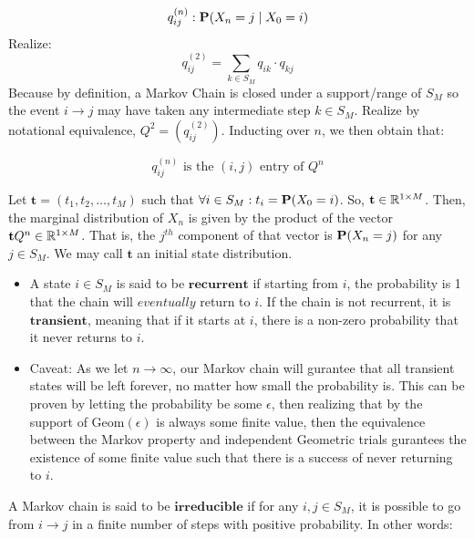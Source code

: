 $$ q_{ij}^{(n)}: \Prb(X_n = j \mid X_0 = i)$$
Realize:
$$q_{ij}^{(2)} = \sum_{k \in S_M} q_{ik}\cdot q_{kj}$$
Because by definition, a Markov Chain is closed under a support/range of $S_M$ so the event $i \to j$ may have taken any intermediate step $k \in S_M$. Realize by notational equivalence, $Q^2 = (q_{ij}^{(2)})$. Inducting over $n$, we then obtain that:

$$q_{ij}^{(n)} \text{ is the } (i,j) \text{ entry of } Q^n$$

\begin{definition} Let $\textbf{t} = (t_1,t_2,\dots,t_M)$ such that $\forall i \in S_M : t_i = \Prb(X_0 = i)$. So, $\textbf{t} \in \R^{1 \times M}$. Then, the marginal distribution of $X_n$ is given by the product of the vector $\textbf{t} Q^n \in \R^{1 \times M}$. That is, the $j^{th}$ component of that vector is $\P(X_n = j)$ for any $j \in S_M$. We may call $\textbf{t}$ an initial state distribution.
\end{definition}

\newpage
{}

\begin{itemize}
\item A state $i \in S_M$ is said to be $\textbf{recurrent}$ if starting from $i$, the probability is 1 that the chain will $\textit{eventually}$ return to $i$. If the chain is not recurrent, it is $\textbf{transient}$, meaning that if it starts at $i$, there is a non-zero probability that it never returns to $i$.

\item Caveat: As we let $n \to \infty$, our Markov chain will gurantee that all transient states will be left forever, no matter how small the probability is. This can be proven by letting the probability be some $\epsilon$, then realizing that by the support of $\text{Geom}(\epsilon)$ is always some finite value, then the equivalence between the Markov property and independent Geometric trials gurantees the existence of some finite value such that there is a success of never returning to $i$.
\end{itemize}

\begin{definition}[Reducibility] A Markov chain is said to be $\textbf{irreducible}$ if for any $i,j \in S_M$, it is possible to go from $i \to j$ in a finite number of steps with positive probability. In other words:
\end{definition}

